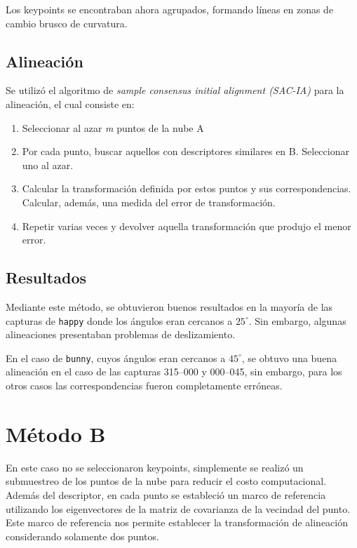 			Los keypoints se encontraban ahora agrupados, formando líneas en zonas de cambio brusco de curvatura.




		\subsection{Alineación}
			Se utilizó el algoritmo de \emph{sample consensus initial alignment (SAC-IA)} para la alineación, el cual consiste en:
			\begin{enumerate}
				\item Seleccionar al azar \emph{m} puntos de la nube A
				\item Por cada punto, buscar aquellos con descriptores similares en B. Seleccionar uno al azar.
				\item Calcular la transformación definida por estos puntos y
					sus correspondencias. Calcular, además, una medida del
					error de transformación.
				\item Repetir varias veces y devolver aquella transformación que produjo el menor error.
			\end{enumerate}

			\subsection{Resultados}
			Mediante este método, se obtuvieron buenos resultados en la mayoría de las
			capturas de \texttt{happy}
			donde los ángulos eran cercanos a $25^{\circ}$.
			Sin embargo, algunas alineaciones presentaban problemas de deslizamiento.

			En el caso de \texttt{bunny}, cuyos ángulos eran cercanos a $45^{\circ}$,
			se obtuvo una buena alineación en el caso de las capturas 315--000 y 000--045,
			sin embargo, para los otros casos las correspondencias fueron completamente erróneas.



	\section{Método B}
		En este caso no se seleccionaron keypoints, simplemente se realizó un submuestreo de
		los puntos de la nube para reducir el costo computacional.
		Además del descriptor, en cada punto se estableció un marco de referencia utilizando los
		eigenvectores de la matriz de covarianza de la vecindad del punto. Este
		marco de referencia nos permite establecer
		la transformación de alineación considerando solamente dos puntos. %

